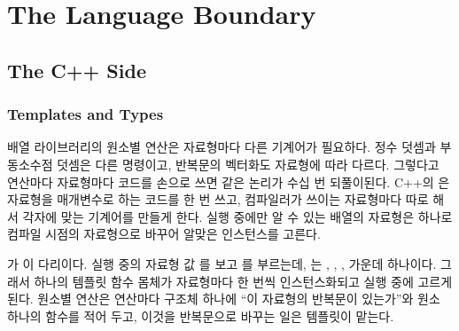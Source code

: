 \chapter{The Language Boundary}
\label{ch:language-boundary}


\section{The C++ Side}
\label{sec:cpp-side}

\subsection{Templates and Types}

배열 라이브러리의 원소별 연산은 자료형마다 다른 기계어가 필요하다. 정수 덧셈과 부동소수점 덧셈은 다른 명령이고, 반복문의 벡터화도 자료형에 따라 다르다. 그렇다고 연산마다 자료형마다 코드를 손으로 쓰면 같은 논리가 수십 번 되풀이된다. C++의 은 자료형을 매개변수로 하는 코드를 한 번 쓰고, 컴파일러가 쓰이는 자료형마다 따로 해서 각자에 맞는 기계어를 만들게 한다\cite{vandevoorde2017templates}. 실행 중에만 알 수 있는 배열의 자료형은  하나로 컴파일 시점의 자료형으로 바꾸어 알맞은 인스턴스를 고른다.

\begin{instardust}
가 이 다리이다. 실행 중의 자료형 값 를 보고 를 부르는데, 는 , , ,  가운데 하나이다. 그래서 하나의 템플릿 함수 몸체가 자료형마다 한 번씩 인스턴스화되고 실행 중에 고르게 된다. 원소별 연산은 연산마다 구조체 하나에 ``이 자료형의 반복문이 있는가''와 원소 하나의 함수를 적어 두고, 이것을 반복문으로 바꾸는 일은 템플릿이 맡는다.
\end{instardust}

